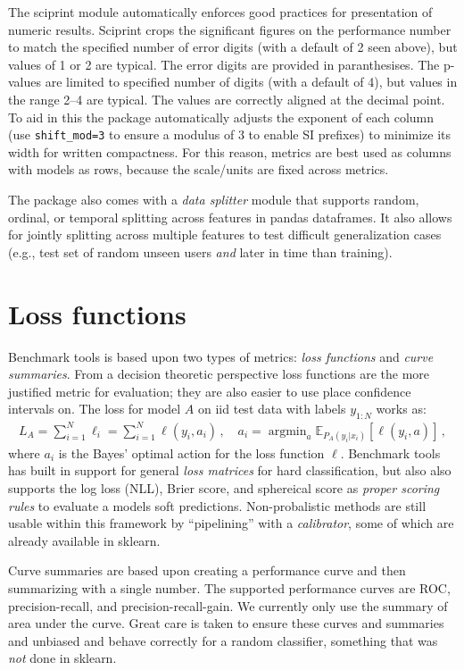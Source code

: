 \documentclass{article}
\newcommand{\E}{\mathbb{E}}
\DeclareMathOperator*{\argmin}{argmin}
\newcommand{\code}{\texttt}
\begin{document}
The sciprint module automatically enforces good practices for presentation of numeric results.
Sciprint crops the significant figures on the performance number to match the specified number of error digits (with a default of 2 seen above), but values of 1 or 2 are typical.
The error digits are provided in paranthesises.
The p-values are limited to specified number of digits (with a default of 4), but values in the range 2--4 are typical.
The values are correctly aligned at the decimal point.
To aid in this the package automatically adjusts the exponent of each column (use \code{shift\_mod=3} to ensure a modulus of 3 to enable SI prefixes) to minimize its width for written compactness.
For this reason, metrics are best used as columns with models as rows, because the scale/units are fixed across metrics.

The package also comes with a \emph{data splitter} module that supports random, ordinal, or temporal splitting across features in pandas dataframes.
It also allows for jointly splitting across multiple features to test difficult generalization cases (e.g., test set of random unseen users \emph{and} later in time than training)\@.

\section{Loss functions}

Benchmark tools is based upon two types of metrics: \emph{loss functions} and \emph{curve summaries}.
From a decision theoretic perspective loss functions are the more justified metric for evaluation; they are also easier to use place confidence intervals on.
The loss for model $A$ on iid test data with labels $y_{1:N}$ works as:
\begin{align}
  L_A = \sum_{i=1}^N \ell_i = \sum_{i=1}^N \ell(y_i, a_i)\,, \quad a_i = \argmin_a \E_{P_A(y_i|x_i)}[\ell(y_i, a)]\,,
\end{align}
where $a_i$ is the Bayes' optimal action for the loss function $\ell$.
Benchmark tools has built in support for general \emph{loss matrices} for hard classification, but also also supports the log loss (NLL), Brier score, and sphereical score as \emph{proper scoring rules} to evaluate a models soft predictions.
Non-probalistic methods are still usable within this framework by ``pipelining'' with a \emph{calibrator}, some of which are already available in sklearn.

Curve summaries are based upon creating a performance curve and then summarizing with a single number.
The supported performance curves are ROC, precision-recall, and precision-recall-gain. %
We currently only use the summary of area under the curve.
Great care is taken to ensure these curves and summaries and unbiased and behave correctly for a random classifier, something that was \emph{not} done in sklearn.  %
\end{document}
